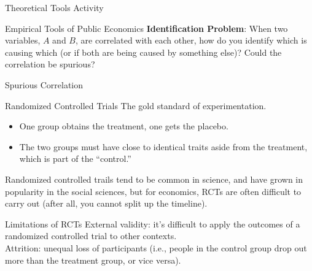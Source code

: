 \documentclass[8pt]{extarticle}
\begin{document}
  \begin{problem}{Theoretical Tools Activity}
   \begin{tcbraster}[raster columns = 1,colframe = black!75!white,colback=white]
   \end{tcbraster} 
  \end{problem}
  \begin{problem}{Empirical Tools of Public Economics}
    \textbf{Identification Problem}: When two variables, $A$ and $B$, are correlated with each other, how do you identify which is causing which (or if both are being caused by something else)? Could the correlation be spurious?
    \begin{problem}{Spurious Correlation}
      \begin{tcbraster}[raster columns = 1,colframe = black!75!white,colback=white]
      \end{tcbraster}
    \end{problem}
    \begin{problem}{Randomized Controlled Trials}
      The gold standard of experimentation.
      \begin{itemize}
        \item One group obtains the treatment, one gets the placebo.
        \item The two groups must have close to identical traits aside from the treatment, which is part of the ``control.''
      \end{itemize}
      Randomized controlled trails tend to be common in science, and have grown in popularity in the social sciences, but for economics, RCTs are often difficult to carry out (after all, you cannot split up the timeline).
      \begin{problem}{Limitations of RCTs}
        External validity: it's difficult to apply the outcomes of a randomized controlled trial to other contexts.\\

        Attrition: unequal loss of participants (i.e., people in the control group drop out more than the treatment group, or vice versa).\\


\end{problem}
\end{problem}
\end{problem}
\end{document}

